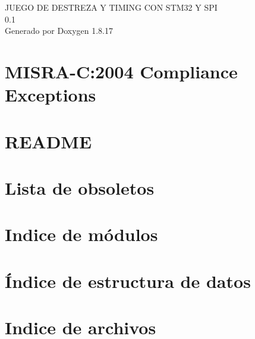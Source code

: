 \let\mypdfximage\pdfximage\def\pdfximage{\immediate\mypdfximage}\documentclass[twoside]{book}
\newcommand{\+}{\discretionary{\mbox{\scriptsize$\hookleftarrow$}}{}{}}
\newcommand{\clearemptydoublepage}{%
  \newpage{\pagestyle{empty}\cleardoublepage}%
}
\begin{document}
\hypersetup{pageanchor=false,
             bookmarksnumbered=true,
             pdfencoding=unicode
            }
\begin{titlepage}
\vspace*{7cm}
\begin{center}%
{\Large J\+U\+E\+GO DE D\+E\+S\+T\+R\+E\+ZA Y T\+I\+M\+I\+NG C\+ON S\+T\+M32 Y S\+PI \\[1ex]\large 0.\+1 }\\
\vspace*{1cm}
{\large Generado por Doxygen 1.8.17}\\
\end{center}
\end{titlepage}
\clearemptydoublepage
{}
\tableofcontents
\clearemptydoublepage
{}
\hypersetup{pageanchor=true}

\chapter{M\+I\+S\+R\+A-\/C\+:2004 Compliance Exceptions}
\label{_c_m_s_i_s__m_i_s_r_a__exceptions}

\chapter{R\+E\+A\+D\+ME}
\label{md__r_e_a_d_m_e}

\chapter{Lista de obsoletos}
\label{deprecated}

\chapter{Indice de módulos}

\chapter{Índice de estructura de datos}

\chapter{Indice de archivos}

\end{document}
